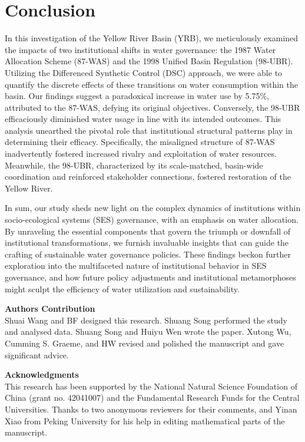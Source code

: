 \documentclass[preprint, 12pt]{elsarticle}
\begin{document}
\section{Conclusion}\label{sec:conclusion}


In this investigation of the Yellow River Basin (YRB), we meticulously examined the impacts of two institutional shifts in water governance: the 1987 Water Allocation Scheme (87-WAS) and the 1998 Unified Basin Regulation (98-UBR).
Utilizing the Differenced Synthetic Control (DSC) approach, we were able to quantify the discrete effects of these transitions on water consumption within the basin.
Our findings suggest a paradoxical increase in water use by 5.75\%, attributed to the 87-WAS, defying its original objectives.
Conversely, the 98-UBR efficaciously diminished water usage in line with its intended outcomes.
This analysis unearthed the pivotal role that institutional structural patterns play in determining their efficacy.
Specifically, the misaligned structure of 87-WAS inadvertently fostered increased rivalry and exploitation of water resources.
Meanwhile, the 98-UBR, characterized by its scale-matched, basin-wide coordination and reinforced stakeholder connections, fostered restoration of the Yellow River.

In sum, our study sheds new light on the complex dynamics of institutions within socio-ecological systems (SES) governance, with an emphasis on water allocation.
By unraveling the essential components that govern the triumph or downfall of institutional transformations, we furnish invaluable insights that can guide the crafting of sustainable water governance policies.
These findings beckon further exploration into the multifaceted nature of institutional behavior in SES governance, and how future policy adjustments and institutional metamorphoses might sculpt the efficiency of water utilization and sustainability.

\textbf{Authors Contribution}\\
Shuai Wang and BF designed this research. Shuang Song performed the study and analysed data. Shuang Song and Huiyu Wen wrote the paper. Xutong Wu, Cumming S. Graeme, and HW revised and polished the manuscript and gave significant advice.

\textbf{Acknowledgments}\\
This research has been supported by the National Natural Science Foundation of China (grant no. 42041007) and the Fundamental Research Funds for the Central Universities. Thanks to two anonymous reviewers for their comments, and Yinan Xiao from Peking University for his help in editing mathematical parts of the manuscript.
\end{document}
